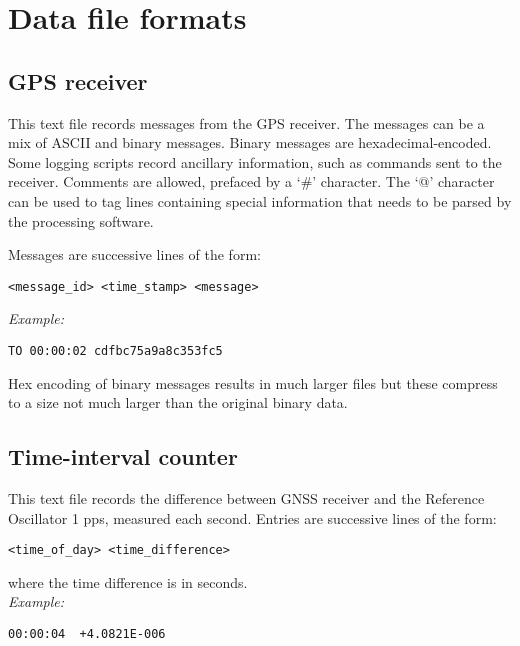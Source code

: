 \section{Data file formats \label{s:DataFileFormat}}

\subsection{GPS receiver}

This text file records messages from the GPS receiver. The messages can be a mix of ASCII and binary messages.
Binary messages are hexadecimal-encoded. Some logging scripts record ancillary information, 
such as commands sent to the receiver. Comments are allowed, prefaced by a `\#' character. 
The `@' character can be used to tag lines containing special information that needs to be parsed by
the processing software.

Messages are successive lines of the form:
\begin{lstlisting}
<message_id> <time_stamp> <message>
\end{lstlisting}
\textit{Example:}
\begin{lstlisting}
TO 00:00:02 cdfbc75a9a8c353fc5
\end{lstlisting}

Hex encoding of binary messages results in much larger files but these compress to a size not much larger
than the original binary data.

\subsection{Time-interval counter \label{s:TICformat}}

This text file records the difference between GNSS receiver and the Reference Oscillator 1 pps,
measured each second. Entries are successive lines of the form:
\begin{lstlisting}
<time_of_day> <time_difference>
\end{lstlisting}
where the time difference is in seconds.\\
\textit{Example:}
\begin{lstlisting}
00:00:04  +4.0821E-006 
\end{lstlisting}










